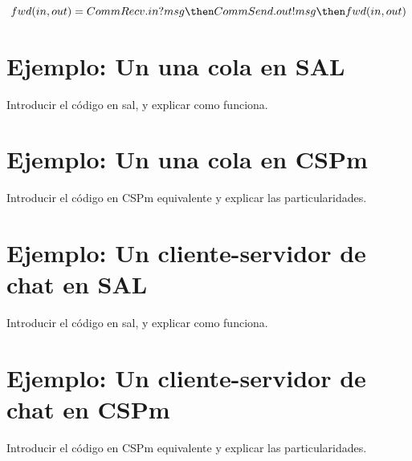 \[
  fwd(in, out) = CommRecv.in?msg \then CommSend.out!msg \then fwd(in, out)
\]


\section{Ejemplo: Un una cola en SAL}

Introducir el código en sal, y explicar como funciona.
\section{Ejemplo: Un una cola en CSPm}

Introducir el código en CSPm equivalente y explicar las particularidades.

\section{Ejemplo: Un cliente-servidor de chat en SAL}

Introducir el código en sal, y explicar como funciona.

\section{Ejemplo: Un cliente-servidor de chat en CSPm}

Introducir el código en CSPm equivalente y explicar las particularidades.
